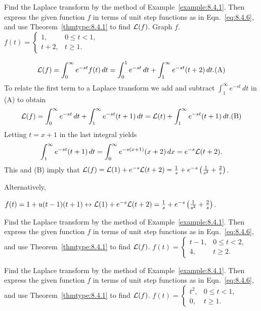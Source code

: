 \documentclass{ximera}
\begin{document}
\begin{problem}\label{exer:8.4.4}
Find the Laplace transform by
the method of Example~\ref{example:8.4.1}. Then express the given function
$f$ in terms of unit step functions as in Eqn.~\eqref{eq:8.4.6}, and use
Theorem~\ref{thmtype:8.4.1} to find ${\cal L}(f)$.  Graph $f$.
$f(t)=\left\{\begin{array}{cl}1,
&0\le t<1,\\ t+2,&t\ge1.\end{array}\right.$

\begin{solution}
$$
{\cal L}(f)  =\int_0^\infty e^{-st}f(t)\, dt
 =\int_0^1 e^{-st}\,dt+\int_1^\infty e^{-st}(t+2)\,dt.
\text{(A)}
$$
To relate the first term to a Laplace transform we  add and subtract
$\int_1^\infty e^{-st}\, dt$
  in (A) to obtain
$$
{\cal L}(f)=\int_0^\infty e^{-st}\,dt+
\int_1^\infty e^{-st}(t+1)\, dt
={\cal L}(t)+\int_1^\infty e^{-st}(t+1)\,dt.
\text{(B)}
$$
Letting $t=x+1$  in the last integral yields
$$
\int_1^\infty e^{-st}(t+1)\,dt=\int_0^\infty e^{-s(x+1)}(x+2)\,dx
 =e^{-s}{\cal L}(t+2).
$$
This and (B) imply that
$ {\cal L}(f)={\cal L}(1)+e^{-s}{\cal L}(t+2)
=\frac{1}{s}+e^{-s}\left(\frac{1}{s^2}+\frac{2}{s}\right)$.

Alternatively,

 $f(t)= 1+u(t-1)(t+1)\leftrightarrow {\cal L}(1)+e^{-s}{\cal
L}(t+2)=
\frac{1}{s}+e^{-s}\left(\frac{1}{s^2}+\frac{2}{s}\right)$.
\end{solution}
\end{problem}

\begin{problem}\label{exer:8.4.5}
Find the Laplace transform by
the method of Example~\ref{example:8.4.1}. Then express the given function
$f$ in terms of unit step functions as in Eqn.~\eqref{eq:8.4.6}, and use
Theorem~\ref{thmtype:8.4.1} to find ${\cal L}(f)$.
$f(t)=\left\{\begin{array}{cl} t-1,& 0\le
t<2,\\ 4,&t\ge2.\end{array}\right.$
\end{problem}

 \begin{problem}\label{exer:8.4.6}
Find the Laplace transform by
the method of Example~\ref{example:8.4.1}. Then express the given function
$f$ in terms of unit step functions as in Eqn.~\eqref{eq:8.4.6}, and use
Theorem~\ref{thmtype:8.4.1} to find ${\cal L}(f)$.
$f(t)=\left\{\begin{array}{cl} t^2,& 0\le
t<1,\\ 0,&t\ge1.\end{array}\right.$
\end{problem}
\end{document}
